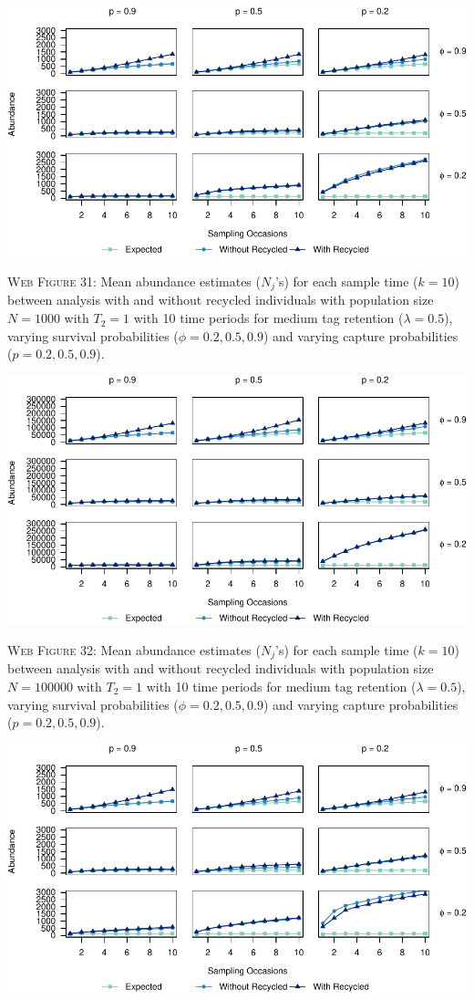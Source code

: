 \documentclass[]{article}
\begin{document}
\newpage

\includegraphics{Appendix_files/figure-latex/31_abundance_M_GJSTL1-1.pdf}

\textsc{Web Figure 31:} Mean abundance estimates (\(N_j\)'s) for each
sample time (\(k=10\)) between analysis with and without recycled
individuals with population size \(N=1000\) with \(T_2=1\) with 10 time
periods for medium tag retention (\(\lambda=0.5\)), varying survival
probabilities (\(\phi=0.2,0.5,0.9\)) and varying capture probabilities
(\(p=0.2,0.5,0.9\)).

\includegraphics{Appendix_files/figure-latex/32_abundance_M_GJSTL2-1.pdf}

\textsc{Web Figure 32:} Mean abundance estimates (\(N_j\)'s) for each
sample time (\(k=10\)) between analysis with and without recycled
individuals with population size \(N=100000\) with \(T_2=1\) with 10
time periods for medium tag retention (\(\lambda=0.5\)), varying
survival probabilities (\(\phi=0.2,0.5,0.9\)) and varying capture
probabilities (\(p=0.2,0.5,0.9\)).

\newpage

\includegraphics{Appendix_files/figure-latex/33_abundance_M_GJSTL4-1.pdf}
\end{document}
